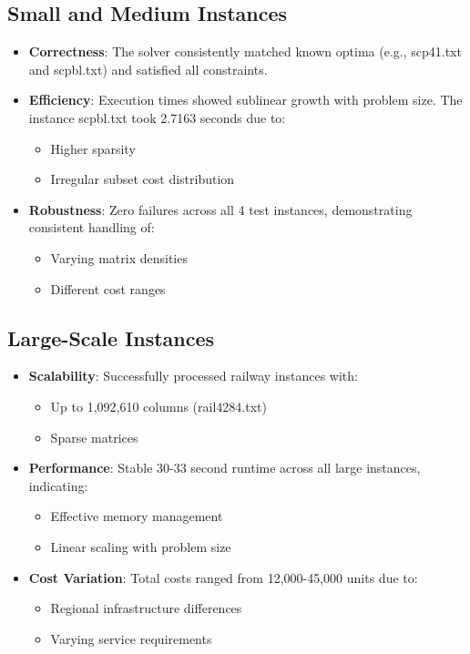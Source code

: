 \documentclass[11pt,letterpaper]{article}
\begin{document}
\subsection*{Small and Medium Instances}
\begin{itemize}
    \item \textbf{Correctness}: The solver consistently matched known optima (e.g., scp41.txt and scpbl.txt) and satisfied all constraints.
    
    \item \textbf{Efficiency}: Execution times showed sublinear growth with problem size. The instance scpbl.txt took 2.7163 seconds due to:
    \begin{itemize}
        \item Higher sparsity 
        \item Irregular subset cost distribution
    \end{itemize}
    
    \item \textbf{Robustness}: Zero failures across all 4 test instances, demonstrating consistent handling of:
    \begin{itemize}
        \item Varying matrix densities
        \item Different cost ranges
    \end{itemize}
\end{itemize}

\subsection*{Large-Scale Instances}
\begin{itemize}
    \item \textbf{Scalability}: Successfully processed railway instances with:
    \begin{itemize}
        \item Up to 1,092,610 columns (rail4284.txt)
        \item Sparse matrices
    \end{itemize}
    
    \item \textbf{Performance}: Stable 30-33 second runtime across all large instances, indicating:
    \begin{itemize}
        \item Effective memory management
        \item Linear scaling with problem size
    \end{itemize}
    
    \item \textbf{Cost Variation}: Total costs ranged from 12,000-45,000 units due to:
    \begin{itemize}
        \item Regional infrastructure differences
        \item Varying service requirements
    \end{itemize}
\end{itemize}
\end{document}
